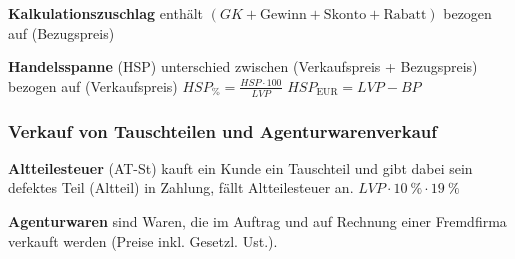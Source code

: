 \textbf{Kalkulationszuschlag} enthält
$(GK + \text{Gewinn} + \text{Skonto} + \text{Rabatt})$ bezogen auf
(Bezugspreis)

\textbf{Handelsspanne} (HSP) unterschied zwischen (Verkaufspreis +
Bezugspreis) bezogen auf (Verkaufspreis)
$\boxed{HSP_\% = \frac{HSP \cdot 100}{LVP}}$
$\boxed{HSP_\text{EUR} = LVP - BP}$

\subsubsection{Verkauf von Tauschteilen und
Agenturwarenverkauf}\label{verkauf-von-tauschteilen-und-agenturwarenverkauf}

\textbf{Altteilesteuer} (AT-St) kauft ein Kunde ein Tauschteil und gibt
dabei sein defektes Teil (Altteil) in Zahlung, fällt Altteilesteuer an.
$\boxed{LVP \cdot 10~\% \cdot 19~\%}$

\textbf{Agenturwaren} sind Waren, die im Auftrag und auf Rechnung einer
Fremdfirma verkauft werden (Preise inkl. Gesetzl. Ust.).
